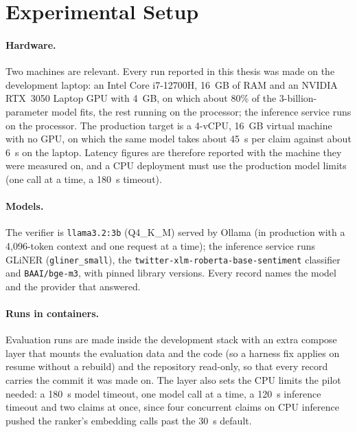
\section{Experimental Setup}
\label{sec:setup}

\paragraph{Hardware.} Two machines are relevant. Every run reported in
this thesis was made on the development laptop: an Intel Core
i7-12700H, 16~GB of RAM and an NVIDIA RTX~3050 Laptop GPU with 4~GB, on
which about 80\% of the 3-billion-parameter model fits, the rest
running on the processor; the inference service runs on the processor.
The production target is a 4-vCPU, 16~GB virtual machine with no GPU,
on which the same model takes about 45~s per claim against about 6~s on
the laptop. Latency figures are therefore reported with the machine
they were measured on, and a CPU deployment must use the production
model limits (one call at a time, a 180~s timeout).

\paragraph{Models.} The verifier is \texttt{llama3.2:3b} (Q4\_K\_M)
served by Ollama (in production with a 4,096-token context and one
request at a time); the inference service
runs GLiNER (\texttt{gliner\_small}), the
\texttt{twitter-xlm-roberta-base-sentiment} classifier and
\texttt{BAAI/bge-m3}, with pinned library versions. Every record names
the model and the provider that answered.

\paragraph{Runs in containers.} Evaluation runs are made inside the
development stack with an extra compose layer that mounts the
evaluation data and the code (so a harness fix applies on resume
without a rebuild) and the repository read-only, so that every record
carries the commit it was made on. The layer also sets the CPU limits
the pilot needed: a 180~s model timeout, one model call at a time, a
120~s inference timeout and two claims at once, since four concurrent
claims on CPU inference pushed the ranker's embedding calls past the
30~s default.

